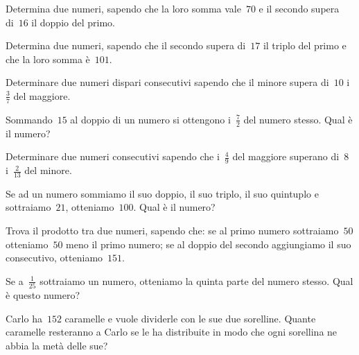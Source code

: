 \begin{multicols}{2}
\begin{esercizio}[\Ast]
\label{ese:16.1}
Determina due numeri, sapendo che la loro somma vale~$70$ e il secondo supera di~$16$ il doppio del primo.
\end{esercizio}

\begin{esercizio}[\Ast]
\label{ese:16.2}
Determina due numeri, sapendo che il secondo supera di~$17$ il triplo del primo e che la loro somma è~$101$.
\end{esercizio}

\begin{esercizio}[\Ast]
\label{ese:16.3}
Determinare due numeri dispari consecutivi sapendo che il minore supera di~$10$ i~$\frac{3}{7}$ del maggiore.
\end{esercizio}

\begin{esercizio}[\Ast]
\label{ese:16.4}
Sommando~$15$ al doppio di un numero si ottengono i~$\frac{7}{2}$ del numero stesso. Qual è il numero?
\end{esercizio}

\begin{esercizio}
\label{ese:16.5}
Determinare due numeri consecutivi sapendo che i~$\frac{4}{9}$ del maggiore superano di~$8$ i~$\frac{2}{13}$ del minore.
\end{esercizio}

\begin{esercizio}[\Ast]
\label{ese:16.6}
Se ad un numero sommiamo il suo doppio, il suo triplo, il suo quintuplo e sottraiamo~$21$, otteniamo~$100$. Qual è il numero?
\end{esercizio}

\begin{esercizio}[\Ast]
\label{ese:16.7}
Trova il prodotto tra due numeri, sapendo che: se al primo numero sottraiamo~$50$ otteniamo~$50$ meno il primo numero; se al doppio del secondo aggiungiamo il suo consecutivo, otteniamo~$151$.
\end{esercizio}

\begin{esercizio}[\Ast]
\label{ese:16.8}
Se a~$\frac{1}{25}$ sottraiamo un numero, otteniamo la quinta parte del numero stesso. Qual è questo numero?
\end{esercizio}

\begin{esercizio}[\Ast]
\label{ese:16.9}
Carlo ha~$152$ caramelle e vuole dividerle con le sue due sorelline. Quante caramelle resteranno a Carlo se le ha distribuite in modo che ogni sorellina ne abbia la metà delle sue?
\end{esercizio}


\end{multicols}
